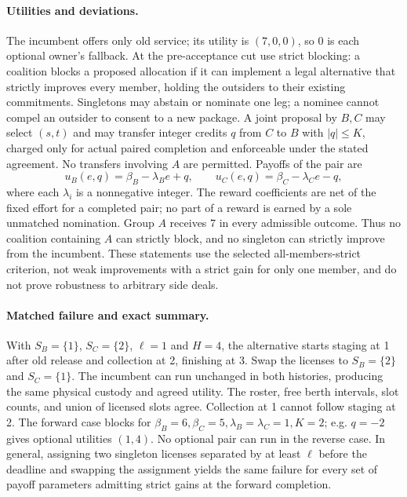 \documentclass[11pt]{article}
\begin{document}
\paragraph{Utilities and deviations.}
The incumbent offers only old service; its utility is $(7,0,0)$, so $0$ is each optional owner's fallback. At the pre-acceptance cut use strict blocking: a coalition blocks a proposed allocation if it can implement a legal alternative that strictly improves every member, holding the outsiders to their existing commitments. Singletons may abstain or nominate one leg; a nominee cannot compel an outsider to consent to a new package. A joint proposal by $B,C$ may select $(s,t)$ and may transfer integer credits $q$ from $C$ to $B$ with $|q|\le K$, charged only for actual paired completion and enforceable under the stated agreement. No transfers involving $A$ are permitted. Payoffs of the pair are
\[
 u_B(e,q)=\beta_B-\lambda_B e+q,\qquad
 u_C(e,q)=\beta_C-\lambda_C e-q,
\]
where each $\lambda_i$ is a nonnegative integer. The reward coefficients are net of the fixed effort for a completed pair; no part of a reward is earned by a sole unmatched nomination. Group $A$ receives $7$ in every admissible outcome. Thus no coalition containing $A$ can strictly block, and no singleton can strictly improve from the incumbent. These statements use the selected all-members-strict criterion, not weak improvements with a strict gain for only one member, and do not prove robustness to arbitrary side deals.

\paragraph{Matched failure and exact summary.}
With $S_B=\{1\}$, $S_C=\{2\}$, $\ell=1$ and $H=4$, the alternative starts staging at 1 after old release and collection at 2, finishing at 3. Swap the licenses to $S_B=\{2\}$ and $S_C=\{1\}$. The incumbent can run unchanged in both histories, producing the same physical custody and agreed utility. The roster, free berth intervals, slot counts, and union of licensed slots agree. Collection at 1 cannot follow staging at 2. The forward case blocks for $\beta_B=6,\beta_C=5,\lambda_B=\lambda_C=1,K=2$; e.g. $q=-2$ gives optional utilities $(1,4)$. No optional pair can run in the reverse case. In general, assigning two singleton licenses separated by at least $\ell$ before the deadline and swapping the assignment yields the same failure for every set of payoff parameters admitting strict gains at the forward completion.
\end{document}

